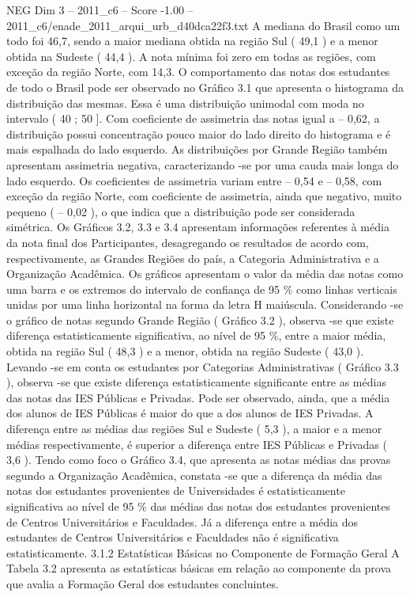 \begin{textsample}{NEG Dim 3 – 2011\_c6 – Score -1.00 – 2011\_c6/enade\_2011\_arqui\_urb\_d40dca22f3.txt}
A mediana do Brasil como um todo foi 46,7, sendo a maior mediana obtida na região Sul ( 49,1 ) e a menor obtida na Sudeste ( 44,4 ).
A nota mínima foi zero em todas as regiões, com exceção da região Norte, com 14,3.
O comportamento das notas dos estudantes de todo o Brasil pode ser observado no Gráfico 3.1 que apresenta o histograma da distribuição das mesmas.
Essa é uma distribuição unimodal com moda no intervalo ( 40 ; 50 ].
Com coeficiente de assimetria das notas igual a – 0,62, a distribuição possui concentração pouco maior do lado direito do histograma e é mais espalhada do lado esquerdo.
As distribuições por Grande Região também apresentam assimetria negativa, caracterizando -se por uma cauda mais longa do lado esquerdo.
Os coeficientes de assimetria variam entre – 0,54 e – 0,58, com exceção da região Norte, com coeficiente de assimetria, ainda que negativo, muito pequeno ( – 0,02 ), o que indica que a distribuição pode ser considerada simétrica.
Os Gráficos 3.2, 3.3 e 3.4 apresentam informações referentes à média da nota final dos Participantes, desagregando os resultados de acordo com, respectivamente, as Grandes Regiões do país, a Categoria Administrativa e a Organização Acadêmica.
Os gráficos apresentam o valor da média das notas como uma barra e os extremos do intervalo de confiança de 95 \% como linhas verticais unidas por uma linha horizontal na forma da letra H maiúscula.
Considerando -se o gráfico de notas segundo Grande Região ( Gráfico 3.2 ), observa -se que existe diferença estatisticamente significativa, ao nível de 95 \%, entre a maior média, obtida na região Sul ( 48,3 ) e a menor, obtida na região Sudeste ( 43,0 ).
Levando -se em conta os estudantes por Categorias Administrativas ( Gráfico 3.3 ), observa -se que existe diferença estatisticamente significante entre as médias das notas das IES Públicas e Privadas.
Pode ser observado, ainda, que a média dos alunos de IES Públicas é maior do que a dos alunos de IES Privadas.
A diferença entre as médias das regiões Sul e Sudeste ( 5,3 ), a maior e a menor médias respectivamente, é superior a diferença entre IES Públicas e Privadas ( 3,6 ).
Tendo como foco o Gráfico 3.4, que apresenta as notas médias das provas segundo a Organização Acadêmica, constata -se que a diferença da média das notas dos estudantes provenientes de Universidades é estatisticamente significativa ao nível de 95 \% das médias das notas dos estudantes provenientes de Centros Universitários e Faculdades.
Já a diferença entre a média dos estudantes de Centros Universitários e Faculdades não é significativa estatisticamente. 3.1.2 Estatísticas Básicas no Componente de Formação Geral A Tabela 3.2 apresenta as estatísticas básicas em relação ao componente da prova que avalia a Formação Geral dos estudantes concluintes.

\end{textsample}
